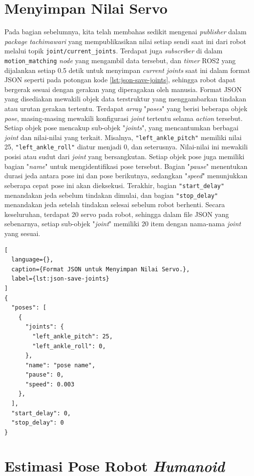 \section{Menyimpan Nilai Servo}
\label{sec:save-servo-value}

Pada bagian sebelumnya, kita telah membahas sedikit mengenai \emph{publisher} dalam \textit{package} \emph{tachimawari} yang mempublikasikan nilai setiap sendi saat ini dari robot melalui topik \verb|joint/current_joints|.
Terdapat juga \emph{subscriber} di dalam \verb|motion_matching| \textit{node} yang mengambil data tersebut, dan \textit{timer} ROS2 yang dijalankan setiap 0.5 detik untuk menyimpan \emph{current joints} saat ini dalam format JSON seperti pada potongan kode \ref{lst:json-save-joints}, sehingga robot dapat bergerak sesuai dengan gerakan yang diperagakan oleh manusia.
Format JSON yang disediakan mewakili objek data terstruktur yang menggambarkan tindakan atau urutan gerakan tertentu. Terdapat \textit{array} "\textit{poses}" yang berisi beberapa objek \textit{pose}, masing-masing mewakili konfigurasi \emph{joint} tertentu selama \textit{action} tersebut.
Setiap objek pose mencakup sub-objek "\textit{joints}", yang mencantumkan berbagai \emph{joint} dan nilai-nilai yang terkait. Misalnya, \verb|"left_ankle_pitch"| memiliki nilai 25, \verb|"left_ankle_roll"| diatur menjadi 0, dan seterusnya. Nilai-nilai ini mewakili posisi atau sudut dari \emph{joint} yang bersangkutan.
Setiap objek pose juga memiliki bagian "\textit{name}" untuk mengidentifikasi pose tersebut. Bagian "\textit{pause}" menentukan durasi jeda antara pose ini dan pose berikutnya, sedangkan "\textit{speed}" menunjukkan seberapa cepat pose ini akan dieksekusi.
Terakhir, bagian \verb|"start_delay"| menandakan jeda sebelum tindakan dimulai, dan bagian \verb|"stop_delay"| menandakan jeda setelah tindakan selesai sebelum robot berhenti. Secara keseluruhan, terdapat 20 servo pada robot, sehingga dalam file JSON yang sebenarnya, setiap sub-objek "\textit{joint}" memiliki 20 item dengan nama-nama \emph{joint} yang sesuai.
\begin{lstlisting}[
  language={},
  caption={Format JSON untuk Menyimpan Nilai Servo.},
  label={lst:json-save-joints}
]
{
  "poses": [
    {
      "joints": {
        "left_ankle_pitch": 25,
        "left_ankle_roll": 0,
      },
      "name": "pose name",
      "pause": 0,
      "speed": 0.003
    },
  ],
  "start_delay": 0,
  "stop_delay": 0
}
\end{lstlisting}


\section{Estimasi Pose Robot \textit{Humanoid}}
\label{sec:humanoid-robot-pose-estimation}

